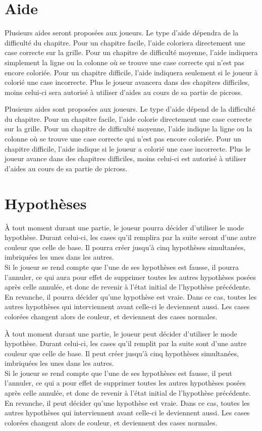 \documentclass{report}
\begin{document}
		\section{Aide}
			Plusieurs aides seront proposées aux joueurs. Le type d'aide dépendra de la difficulté du chapitre. Pour un chapitre facile, l'aide coloriera directement une case correcte sur la grille. Pour un chapitre de difficulté moyenne, l'aide indiquera simplement la ligne ou la colonne où se trouve une case correcte qui n'est pas encore coloriée. Pour un chapitre difficile, l'aide indiquera seulement si le joueur à colorié une case incorrecte. Plus le joueur avancera dans des chapitres difficiles, moins celui-ci sera autorisé à utiliser d'aides au cours de sa partie de picross.

			Plusieurs aides sont proposées aux joueurs. Le type d'aide dépend de la difficulté du chapitre. Pour un chapitre facile, l'aide colorie directement une case correcte sur la grille. Pour un chapitre de difficulté moyenne, l'aide indique la ligne ou la colonne où se trouve une case correcte qui n'est pas encore coloriée. Pour un chapitre difficile, l'aide indique si le joueur a colorié une case incorrecte. Plus le joueur avance dans des chapitres difficiles, moins celui-ci est autorisé à utiliser d'aides au cours de sa partie de picross.

		\section{Hypothèses}			
			À tout moment durant une partie, le joueur pourra décider d'utiliser le mode hypothèse. Durant celui-ci, les cases qu'il remplira par la suite seront d'une autre couleur que celle de base. Il pourra créer jusqu'à cinq hypothèses simultanées, imbriquées les unes dans les autres.\\
			Si le joueur se rend compte que l'une de ses hypothèses est fausse, il pourra l'annuler, ce qui aura pour effet de supprimer toutes les autres hypothèses posées après celle annulée, et donc de revenir à l'état initial de l'hypothèse précédente.\\
			En revanche, il pourra décider qu'une hypothèse est vraie. Dans ce cas, toutes les autres hypothèses qui interviennent avant celle-ci le deviennent aussi. Les cases colorées changent alors de couleur, et deviennent des cases normales.

			À tout moment durant une partie, le joueur peut décider d'utiliser le mode hypothèse. Durant celui-ci, les cases qu'il remplit par la suite sont d'une autre couleur que celle de base. Il peut créer jusqu'à cinq hypothèses simultanées, imbriquées les unes dans les autres.\\
			Si le joueur se rend compte que l'une de ses hypothèses est fausse, il peut l'annuler, ce qui a pour effet de supprimer toutes les autres hypothèses posées après celle annulée, et donc de revenir à l'état initial de l'hypothèse précédente.\\
			En revanche, il peut décider qu'une hypothèse est vraie. Dans ce cas, toutes les autres hypothèses qui interviennent avant celle-ci le deviennent aussi. Les cases colorées changent alors de couleur, et deviennent des cases normales.
		
\end{document}
